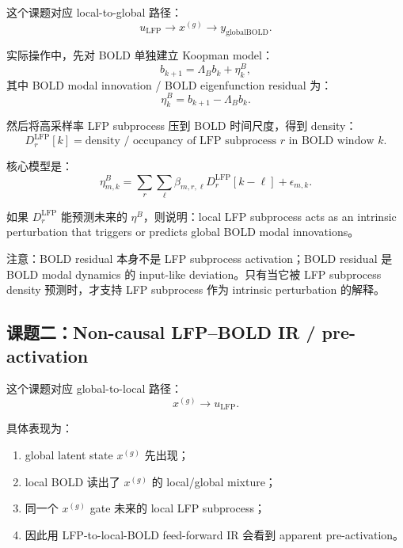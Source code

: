 \documentclass[11pt,a4paper]{ctexart}
\begin{document}
这个课题对应 local-to-global 路径：
\begin{equation}
    u_{\mathrm{LFP}} \rightarrow x^{(g)} \rightarrow y_{\mathrm{globalBOLD}}.
\end{equation}

实际操作中，先对 BOLD 单独建立 Koopman model：
\begin{equation}
    b_{k+1}=\Lambda_B b_k+\eta_k^B,
\end{equation}
其中 BOLD modal innovation / BOLD eigenfunction residual 为：
\begin{equation}
    \eta_k^B=b_{k+1}-\Lambda_B b_k.
\end{equation}

然后将高采样率 LFP subprocess 压到 BOLD 时间尺度，得到 density：
\begin{equation}
    D_r^{\mathrm{LFP}}[k]
    =
    \text{density / occupancy of LFP subprocess } r
    \text{ in BOLD window } k.
\end{equation}

核心模型是：
\begin{equation}
    \eta_{m,k}^B
    =
    \sum_r\sum_{\ell}
    \beta_{m,r,\ell}D_r^{\mathrm{LFP}}[k-\ell]
    +
    \epsilon_{m,k}.
\end{equation}

如果 $D_r^{\mathrm{LFP}}$ 能预测未来的 $\eta^B$，则说明：local LFP subprocess acts as an intrinsic perturbation that triggers or predicts global BOLD modal innovations。

注意：BOLD residual 本身不是 LFP subprocess activation；BOLD residual 是 BOLD modal dynamics 的 input-like deviation。只有当它被 LFP subprocess density 预测时，才支持 LFP subprocess 作为 intrinsic perturbation 的解释。

\subsection{课题二：Non-causal LFP--BOLD IR / pre-activation}

这个课题对应 global-to-local 路径：
\begin{equation}
    x^{(g)} \rightarrow u_{\mathrm{LFP}}.
\end{equation}

具体表现为：
\begin{enumerate}
    \item global latent state $x^{(g)}$ 先出现；
    \item local BOLD 读出了 $x^{(g)}$ 的 local/global mixture；
    \item 同一个 $x^{(g)}$ gate 未来的 local LFP subprocess；
    \item 因此用 LFP-to-local-BOLD feed-forward IR 会看到 apparent pre-activation。
\end{enumerate}
\end{document}
